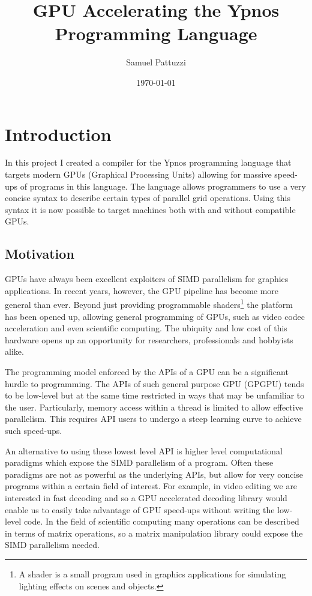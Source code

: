 \documentclass[12pt,a4paper,twoside]{scrbook}
\title{GPU Accelerating the Ypnos Programming Language}
\author{Samuel Pattuzzi}
\date{\today}
\begin{document}
\frontmatter

\maketitle



\mainmatter
\chapter{Introduction}

In this project I created a compiler for the Ypnos programming language that
targets modern GPUs (Graphical Processing Units) allowing for massive speed-ups of programs in this
language. The language allows programmers to use a very concise syntax to
describe certain types of parallel grid operations. Using this syntax it is now
possible to target machines both with and without compatible GPUs.

\section{Motivation}

GPUs have always been excellent exploiters of SIMD parallelism for graphics
applications. In recent years, however, the GPU pipeline has become more general
than ever. Beyond just providing programmable shaders\footnote{A shader is a
  small program used in graphics applications for simulating lighting effects on
  scenes and objects.} the platform has been opened up, allowing general
programming of GPUs, such as video codec acceleration and even scientific
computing. The ubiquity and low cost of this hardware opens up an opportunity
for researchers, professionals and hobbyists alike.

The programming model enforced by the APIs of a GPU can be a significant hurdle
to programming. The APIs of such general purpose GPU (GPGPU) tends to be
low-level but at the same time restricted in ways that may be unfamiliar to the
user. Particularly, memory access within a thread is limited to allow effective
parallelism. This requires API users to undergo a steep learning curve to
achieve such speed-ups.

An alternative to using these lowest level API is higher level computational
paradigms which expose the SIMD parallelism of a program. Often these paradigms
are not as powerful as the underlying APIs, but allow for very concise programs
within a certain field of interest. For example, in video editing we are
interested in fast decoding and so a GPU accelerated decoding library would
enable us to easily take advantage of GPU speed-ups without writing the
low-level code. In the field of scientific computing many operations can be
described in terms of matrix operations, so a matrix manipulation library could
expose the SIMD parallelism needed.
\end{document}
